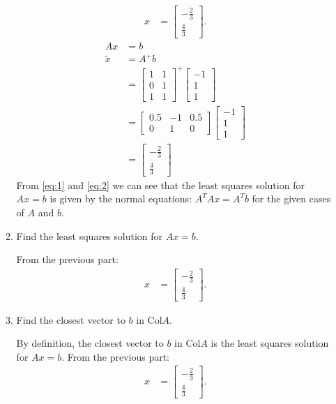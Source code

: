 \documentclass{zc-ust-hw}
\begin{document}
\begin{enumerate}
\begin{enumerate}
\begin{sol}
\begin{align}
            x &= \begin{bmatrix} -\frac{2}{3}\\ \frac{4}{3} \end{bmatrix} \label{eq:1}
          .\end{align}
          \begin{align}
            Ax &= b \\
            \tilde{x} &= A^+b \\
            &= \begin{bmatrix} 1 & 1 \\ 0 & 1 \\ 1 & 1 \end{bmatrix}^+ \begin{bmatrix} -1 \\ 1 \\ 1 \end{bmatrix} \\
            &= \begin{bmatrix}0.5&-1&0.5\\0&1&0\end{bmatrix} \begin{bmatrix} -1 \\ 1 \\ 1 \end{bmatrix} \\
            &= \begin{bmatrix} -\frac{2}{3}\\ \frac{4}{3} \end{bmatrix} \label{eq:2}
          \end{align}
          From \eqref{eq:1} and \eqref{eq:2} we can see that the least squares solution for \(Ax=b\) is given by the normal equations: \(A^TAx=A^Tb\) for the given cases of $A$ and $b$.
        \end{sol}
      \item Find the least squares solution for \(Ax=b\).
        \begin{sol}
          From the previous part:
          \begin{align}
            x &= \begin{bmatrix} -\frac{2}{3}\\ \frac{4}{3} \end{bmatrix}
          .\end{align}
        \end{sol}
      \item Find the closest vector to \(b\) in Col\(A\).
        \begin{sol}
          By definition, the closest vector to \(b\) in Col\(A\) is the least squares solution for \(Ax=b\). From the previous part:
          \begin{align}
            x &= \begin{bmatrix} -\frac{2}{3}\\ \frac{4}{3} \end{bmatrix}
          .\end{align}
        \end{sol}
    \end{enumerate}


\end{enumerate}
\end{document}
